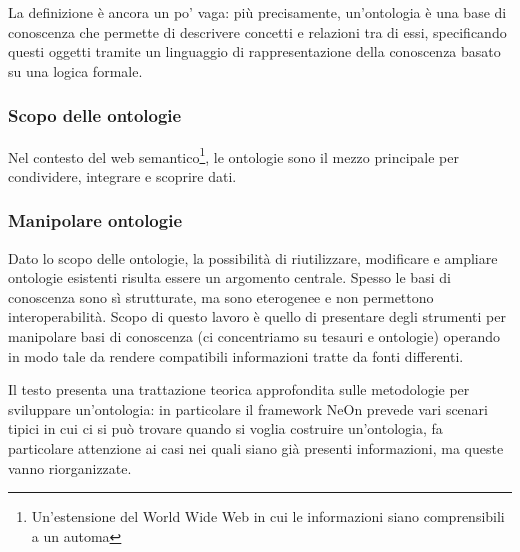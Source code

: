 La definizione è ancora un po' vaga: più precisamente, un'ontologia è una base di conoscenza che permette di descrivere concetti e relazioni tra di essi, specificando questi oggetti tramite un linguaggio di rappresentazione della conoscenza basato su una logica formale.
\subsubsection{Scopo delle ontologie}
Nel contesto del web semantico\footnote{Un'estensione del World Wide Web in cui le informazioni siano comprensibili a un automa\cite{berners2001new}}, le ontologie sono il mezzo principale per condividere, integrare e scoprire dati\cite{hitzler2021review}.
\subsubsection{Manipolare ontologie}
 Dato lo scopo delle ontologie, la possibilità di riutilizzare, modificare e ampliare ontologie esistenti risulta essere un argomento centrale. Spesso le basi di conoscenza sono sì strutturate, ma sono eterogenee e non permettono interoperabilità. Scopo di questo lavoro è quello di presentare degli strumenti per manipolare basi di conoscenza (ci concentriamo su tesauri e ontologie) operando in modo tale da rendere compatibili informazioni tratte da fonti differenti. 
 
 Il testo \cite{suarez2015neon} presenta una trattazione teorica approfondita sulle metodologie per sviluppare un'ontologia: in particolare il framework NeOn prevede vari scenari tipici in cui ci si può trovare quando si voglia costruire un'ontologia, fa particolare attenzione ai casi nei quali siano già presenti informazioni, ma queste vanno riorganizzate.

